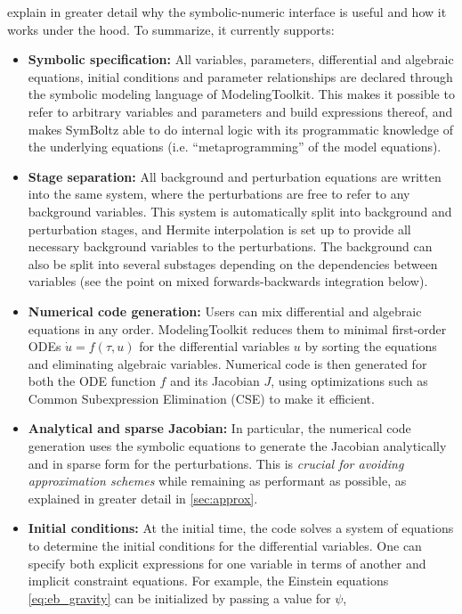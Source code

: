 \documentclass[USenglish, thumbmarks]{uiophdthesis} %
\begin{document}
 explain in greater detail
why the symbolic-numeric interface is useful
and how it works under the hood.
To summarize, it currently supports:
\begin{itemize}
\item \textbf{Symbolic specification:}
All variables, parameters, differential and algebraic equations, initial conditions and parameter relationships
are declared through the symbolic modeling language of ModelingToolkit.
This makes it possible to refer to arbitrary variables and parameters and build expressions thereof,
and makes SymBoltz able to do internal logic with its programmatic knowledge of the underlying equations
(i.e. \enquote{metaprogramming} of the model equations).
\item \textbf{Stage separation:}
All background and perturbation equations are written into the same system,
where the perturbations are free to refer to any background variables.
This system is automatically split into background and perturbation stages,
and Hermite interpolation is set up to provide all necessary background variables to the perturbations.
The background can also be split into several substages
depending on the dependencies between variables (see the point on mixed forwards-backwards integration below).
\item \textbf{Numerical code generation:}
Users can mix differential and algebraic equations in any order.
ModelingToolkit reduces them to minimal first-order ODEs $\dot{u} = f(\tau,u)$
for the differential variables $u$
by sorting the equations and eliminating algebraic variables.
Numerical code is then generated for both the ODE function $f$ and its Jacobian $J$,
using optimizations such as Common Subexpression Elimination (CSE) to make it efficient.
\item \textbf{Analytical and sparse Jacobian:}
In particular, the numerical code generation uses the symbolic equations to generate the Jacobian analytically
and in sparse form for the perturbations.
This is \emph{crucial for avoiding approximation schemes} while remaining as performant as possible,
as explained in greater detail in \cref{sec:approx}.
\item \textbf{Initial conditions:}
At the initial time,
the code solves a system of equations to determine the initial conditions for the differential variables.
One can specify both explicit expressions for one variable in terms of another
and implicit constraint equations.
For example, the Einstein equations \eqref{eq:eb_gravity}
can be initialized by passing a value for $\psi$,

\end{itemize}
\end{document}
